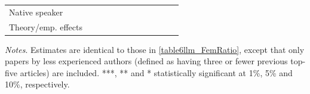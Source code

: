 \begin{table}
\begin{threeparttable}
\begin{tabular}{p{3cm}S@{}S@{}S@{}S@{}S@{}S@{}S@{}S@{}S@{}S@{}S@{}}
            Native speaker                &               &           {}   &               &           {}   &               &           {}   &               &           {}   &               &               &               \\
            Theory/emp. effects           &               &           {}   &               &           {}   &               &           {}   &               &           {}   &               &               &               \\
            \bottomrule
        \end{tabular}
        \begin{tablenotes}
            \tiny
            \item \textit{Notes}. Estimates are identical to those in \autoref{table6llm_FemRatio}, except that only papers by less experienced authors (defined as having three or fewer previous top-five articles) are included. ***, ** and * statistically significant at 1\%, 5\% and 10\%, respectively.
        \end{tablenotes}
    \end{threeparttable}

\end{table}
